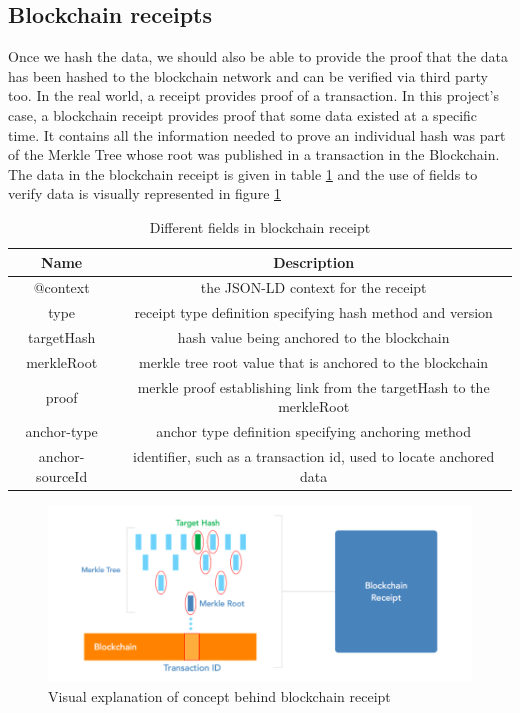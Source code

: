 \subsection{Blockchain receipts}
Once we hash the data, we should also be able to provide the proof that the data has been hashed to the blockchain network and can be verified via third party too. In the real world, a receipt provides proof of a transaction. In this project's case, a blockchain receipt provides proof that some data existed at a specific time. It contains all the information needed to prove an individual hash was part of the Merkle Tree whose root was published in a transaction in the Blockchain. The data in the blockchain receipt is given in table \ref{table:receipt} and the use of fields to verify data is visually represented in figure \ref{fig:merkle}
\begin{table}[h!]
\centering
\begin{tabular}{||c c||} 
\hline
Name & Description  \\ [0.5ex] 
\hline\hline
@context & the JSON-LD context for the receipt \\ 
\hline
type & receipt type definition specifying hash method and version \\
\hline
targetHash & hash value being anchored to the blockchain \\
\hline
merkleRoot	& merkle tree root value that is anchored to the blockchain \\
\hline
proof	& merkle proof establishing link from the targetHash to the merkleRoot \\
\hline
anchor-type	& anchor type definition specifying anchoring method \\
\hline
anchor-sourceId &	identifier, such as a transaction id, used to locate anchored data \\ [1ex]
 \hline
\end{tabular}
\caption{Different fields in blockchain receipt}
\label{table:receipt}
\end{table}

\begin{figure}[ht]
    \centering
    \includegraphics[width=\textwidth]{Figures/Merkle.png}
    \caption{Visual explanation of concept behind blockchain receipt\cite{Wayne2016Chainpoint:Receipts}}
    \label{fig:merkle}
\end{figure}

